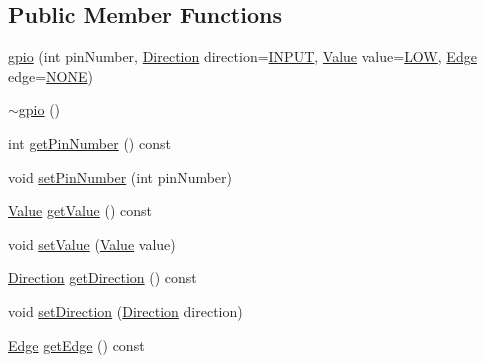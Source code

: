 \subsection*{Public Member Functions}
\begin{DoxyCompactItemize}
\item 
\hyperlink{classo_cpt_1_1protocol_1_1gpio_a8ceba8e1629d1d6e87da53eb097d81e5}{gpio} (int pin\+Number, \hyperlink{classo_cpt_1_1protocol_1_1gpio_af7acf963933bbc47d11d6fa1b8ce4d5b}{Direction} direction=\hyperlink{classo_cpt_1_1protocol_1_1gpio_af7acf963933bbc47d11d6fa1b8ce4d5bac8229afa7339514d640fdd7512456ec1}{I\+N\+P\+UT}, \hyperlink{classo_cpt_1_1protocol_1_1gpio_a7d2d1d34f177f209ad642098d168656f}{Value} value=\hyperlink{classo_cpt_1_1protocol_1_1gpio_a7d2d1d34f177f209ad642098d168656faa2cdaa57258d16622e014ff5d766f095}{L\+OW}, \hyperlink{classo_cpt_1_1protocol_1_1gpio_adbbd34b2bc4394ad5a71d94641dda9f9}{Edge} edge=\hyperlink{classo_cpt_1_1protocol_1_1gpio_adbbd34b2bc4394ad5a71d94641dda9f9a97a153b16162f7d3ebd04fe1bc59b8f8}{N\+O\+NE})
\item 
\hyperlink{classo_cpt_1_1protocol_1_1gpio_a8ab3c04e4643a838f8d9ea26367e3545}{$\sim$gpio} ()
\item 
int \hyperlink{classo_cpt_1_1protocol_1_1gpio_a66f03a0097a751d56f046e1537432291}{get\+Pin\+Number} () const
\item 
void \hyperlink{classo_cpt_1_1protocol_1_1gpio_a1f3a810d9f15c6021c9df71994c08bd6}{set\+Pin\+Number} (int pin\+Number)
\item 
\hyperlink{classo_cpt_1_1protocol_1_1gpio_a7d2d1d34f177f209ad642098d168656f}{Value} \hyperlink{classo_cpt_1_1protocol_1_1gpio_a036e04db41883ec0e33dc9cf279a51f9}{get\+Value} () const
\item 
void \hyperlink{classo_cpt_1_1protocol_1_1gpio_a869cfd12f0b74afedb7dbb40eacfa402}{set\+Value} (\hyperlink{classo_cpt_1_1protocol_1_1gpio_a7d2d1d34f177f209ad642098d168656f}{Value} value)
\item 
\hyperlink{classo_cpt_1_1protocol_1_1gpio_af7acf963933bbc47d11d6fa1b8ce4d5b}{Direction} \hyperlink{classo_cpt_1_1protocol_1_1gpio_aa89066f15bd97035908e7df75913c54b}{get\+Direction} () const
\item 
void \hyperlink{classo_cpt_1_1protocol_1_1gpio_acf2779bab1d3e1d5ebccee55b9af6d5e}{set\+Direction} (\hyperlink{classo_cpt_1_1protocol_1_1gpio_af7acf963933bbc47d11d6fa1b8ce4d5b}{Direction} direction)
\item 
\hyperlink{classo_cpt_1_1protocol_1_1gpio_adbbd34b2bc4394ad5a71d94641dda9f9}{Edge} \hyperlink{classo_cpt_1_1protocol_1_1gpio_a1eaae952cf8f11f4d62989dace78607e}{get\+Edge} () const

\end{DoxyCompactItemize}
